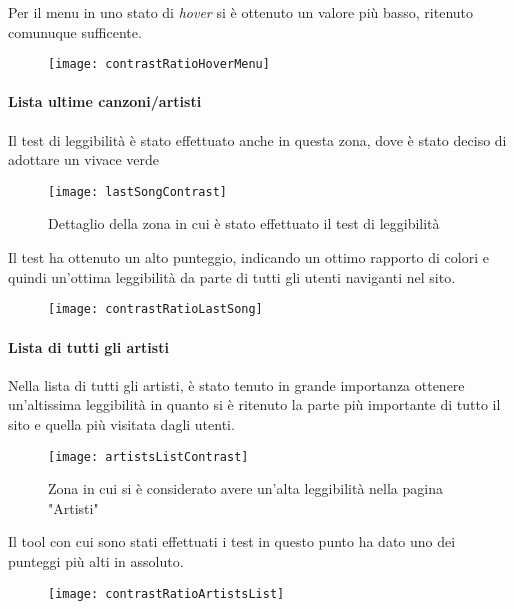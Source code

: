 Per il menu in uno stato di \textit{hover} si è ottenuto un valore più basso, ritenuto comunuque sufficente.
\begin{figure}[H]

    \centering
    \texttt{[image: contrastRatioHoverMenu]}

\end{figure}


\paragraph*{Lista ultime canzoni/artisti}Il test di leggibilità è stato effettuato anche in questa zona, dove è stato deciso di adottare un vivace verde
\begin{figure}[H]

    \centering
    \texttt{[image: lastSongContrast]}
    \caption{Dettaglio della zona in cui è stato effettuato il test di leggibilità}

\end{figure}

Il test ha ottenuto un alto punteggio, indicando un ottimo rapporto di colori e quindi un'ottima leggibilità da parte di tutti gli utenti naviganti nel sito.
\begin{figure}[H]

    \centering
    \texttt{[image: contrastRatioLastSong]}

\end{figure}

\paragraph*{Lista di tutti gli artisti}Nella lista di tutti gli artisti, è stato tenuto in grande importanza ottenere un'altissima leggibilità in quanto si è ritenuto la parte più importante di tutto il sito e quella più visitata dagli utenti.

\begin{figure}[H]

    \centering
    \texttt{[image: artistsListContrast]}
    \caption{Zona in cui si è considerato avere un'alta leggibilità nella pagina "Artisti"}

\end{figure}

Il tool con cui sono stati effettuati i test in questo punto ha dato uno dei punteggi più alti in assoluto.
\begin{figure}[H]

    \centering
    \texttt{[image: contrastRatioArtistsList]}

\end{figure}

